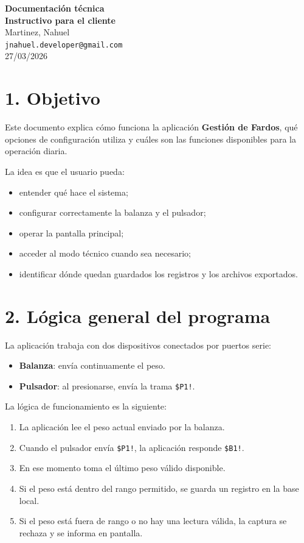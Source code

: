 \documentclass[12pt,a4paper]{article}
\begin{document}
\begin{center}
{\Large \textbf{Documentaci\'on t\'ecnica}}\\[0.5cm]
{\LARGE \textbf{Instructivo para el cliente}}\\[0.8cm]
{\large Martinez, Nahuel}\\[0.2cm]
{\normalsize \texttt{jnahuel.developer@gmail.com}}\\[0.2cm]
{\normalsize 27/03/2026}
\end{center}

\vspace{0.8cm}

\section*{1. Objetivo}

Este documento explica c\'omo funciona la aplicaci\'on \textbf{Gesti\'on de Fardos}, qu\'e opciones de configuraci\'on utiliza y cu\'ales son las funciones disponibles para la operaci\'on diaria.

La idea es que el usuario pueda:

\begin{itemize}
\item entender qu\'e hace el sistema;
\item configurar correctamente la balanza y el pulsador;
\item operar la pantalla principal;
\item acceder al modo t\'ecnico cuando sea necesario;
\item identificar d\'onde quedan guardados los registros y los archivos exportados.
\end{itemize}

\section*{2. L\'ogica general del programa}

La aplicaci\'on trabaja con dos dispositivos conectados por puertos serie:

\begin{itemize}
\item \textbf{Balanza}: env\'ia continuamente el peso.
\item \textbf{Pulsador}: al presionarse, env\'ia la trama \texttt{\$P1!}.
\end{itemize}

La l\'ogica de funcionamiento es la siguiente:

\begin{enumerate}
\item La aplicaci\'on lee el peso actual enviado por la balanza.
\item Cuando el pulsador env\'ia \texttt{\$P1!}, la aplicaci\'on responde \texttt{\$B1!}.
\item En ese momento toma el \'ultimo peso v\'alido disponible.
\item Si el peso est\'a dentro del rango permitido, se guarda un registro en la base local.
\item Si el peso est\'a fuera de rango o no hay una lectura v\'alida, la captura se rechaza y se informa en pantalla.
\end{enumerate}
\end{document}
